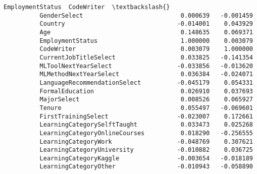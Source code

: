 \documentclass[11pt]{article}
\begin{document}
\begin{Verbatim}[commandchars=\\\{\}]
                                         EmploymentStatus  CodeWriter  \textbackslash{}
          GenderSelect                           0.000639   -0.001459   
          Country                               -0.014001    0.043929   
          Age                                    0.148635    0.069371   
          EmploymentStatus                       1.000000    0.003079   
          CodeWriter                             0.003079    1.000000   
          CurrentJobTitleSelect                  0.033825   -0.141354   
          MLToolNextYearSelect                  -0.033856   -0.013620   
          MLMethodNextYearSelect                 0.036384   -0.024071   
          LanguageRecommendationSelect          -0.045179    0.054331   
          FormalEducation                        0.026910    0.037693   
          MajorSelect                            0.008526    0.065927   
          Tenure                                 0.055497   -0.069601   
          FirstTrainingSelect                   -0.023007    0.172661   
          LearningCategorySelftTaught            0.033473    0.025268   
          LearningCategoryOnlineCourses          0.018290   -0.256555   
          LearningCategoryWork                  -0.048769    0.307621   
          LearningCategoryUniversity            -0.010882    0.036725   
          LearningCategoryKaggle                -0.003654   -0.018189   
          LearningCategoryOther                 -0.010943   -0.058890   
          

\end{Verbatim}
\end{document}
